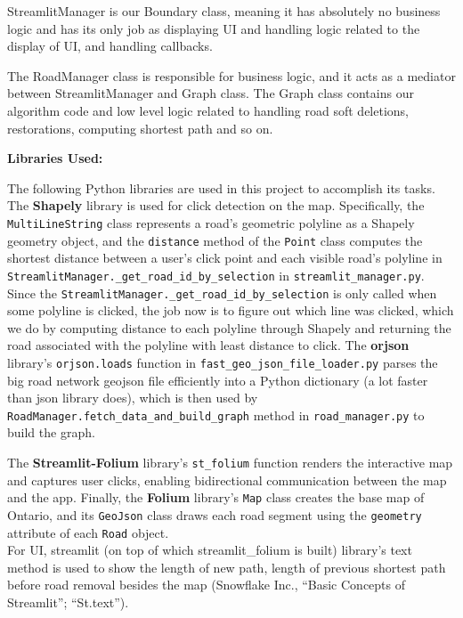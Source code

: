 \documentclass[fontsize=11pt]{article}
\begin{document}
StreamlitManager is our Boundary class, meaning it has absolutely no business logic and has its only job as displaying UI and handling logic related to the display of UI, and handling callbacks.

The RoadManager class is responsible for business logic, and it acts as a mediator between StreamlitManager and Graph class. The Graph class contains our algorithm code and low level logic related to handling road soft deletions, restorations, computing shortest path and so on.

\textbf{Libraries Used:}

The following Python libraries are used in this project to accomplish its tasks. The \textbf{Shapely} library is used for click detection on the map. Specifically, the \texttt{MultiLineString} class represents a road's geometric polyline as a Shapely geometry object, and the \texttt{distance} method of the \texttt{Point} class computes the shortest distance between a user's click point and each visible road's polyline in \texttt{StreamlitManager.\_get\_road\_id\_by\_selection} in \texttt{streamlit\_manager.py}. Since the \texttt{StreamlitManager.\_get\_road\_id\_by\_selection} is only called when some polyline is clicked, the job now is to figure out which line was clicked, which we do by computing distance to each polyline through Shapely and returning the road associated with the polyline with least distance to click. The \textbf{orjson} library's \texttt{orjson.loads} function in \texttt{fast\_geo\_json\_file\_loader.py} parses the big road network geojson file efficiently into a Python dictionary (a lot faster than json library does), which is then used by \texttt{RoadManager.fetch\_data\_and\_build\_graph} method in \texttt{road\_manager.py} to build the graph. 

The \textbf{Streamlit-Folium} library's \texttt{st\_folium} function renders the interactive map and captures user clicks, enabling bidirectional communication between the map and the app. Finally, the \textbf{Folium} library's \texttt{Map} class creates the base map of Ontario, and its \texttt{GeoJson} class draws each road segment using the \texttt{geometry} attribute of each \texttt{Road} object. \\

For UI, streamlit (on top of which streamlit\_folium is built) library's text method is used to show the length of new path, length of previous shortest path before road removal besides the map (Snowflake Inc., “Basic Concepts of Streamlit”; “St.text”).
\end{document}
